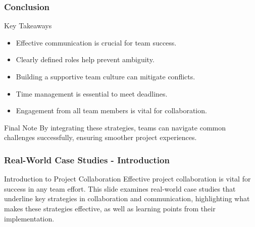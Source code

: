 \documentclass[aspectratio=169]{beamer}
\begin{document}
\begin{frame}[fragile]
    \frametitle{Conclusion}
    \begin{block}{Key Takeaways}
        \begin{itemize}
            \item Effective communication is crucial for team success.
            \item Clearly defined roles help prevent ambiguity.
            \item Building a supportive team culture can mitigate conflicts.
            \item Time management is essential to meet deadlines.
            \item Engagement from all team members is vital for collaboration.
        \end{itemize}
    \end{block}
    \begin{block}{Final Note}
        By integrating these strategies, teams can navigate common challenges successfully, ensuring smoother project experiences.
    \end{block}
\end{frame}

\begin{frame}[fragile]
    \frametitle{Real-World Case Studies - Introduction}
    \begin{block}{Introduction to Project Collaboration}
        Effective project collaboration is vital for success in any team effort. This slide examines real-world case studies that underline key strategies in collaboration and communication, highlighting what makes these strategies effective, as well as learning points from their implementation.
    \end{block}
\end{frame}
\end{document}
